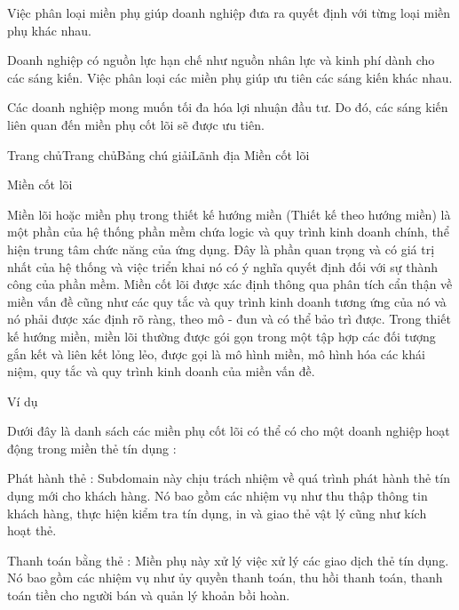 Việc phân loại miền phụ giúp doanh nghiệp đưa ra quyết định với từng loại miền phụ khác nhau.

Doanh nghiệp có nguồn lực hạn chế như nguồn nhân lực và kinh phí dành cho các sáng kiến. Việc phân loại các miền phụ giúp ưu tiên các sáng kiến khác nhau.

Các doanh nghiệp mong muốn tối đa hóa lợi nhuận đầu tư. Do đó, các sáng kiến liên quan đến miền phụ cốt lõi sẽ được ưu tiên.


%






Trang chủTrang chủBảng chú giảiLãnh địa Miền cốt lõi

Miền cốt lõi

Miền lõi hoặc miền phụ trong thiết kế hướng miền (Thiết kế theo hướng miền) là một phần của hệ thống phần mềm chứa logic và quy trình kinh doanh chính, thể hiện trung tâm chức năng của ứng dụng. Đây là phần quan trọng và có giá trị nhất của hệ thống và việc triển khai nó có ý nghĩa quyết định đối với sự thành công của phần mềm. Miền cốt lõi được xác định thông qua phân tích cẩn thận về miền vấn đề cũng như các quy tắc và quy trình kinh doanh tương ứng của nó và nó phải được xác định rõ ràng, theo mô - đun và có thể bảo trì được. Trong thiết kế hướng miền, miền lõi thường được gói gọn trong một tập hợp các đối tượng gắn kết và liên kết lỏng lẻo, được gọi là mô hình miền, mô hình hóa các khái niệm, quy tắc và quy trình kinh doanh của miền vấn đề.

Ví dụ

Dưới đây là danh sách các miền phụ cốt lõi có thể có cho một doanh nghiệp hoạt động trong miền thẻ tín dụng :

Phát hành thẻ : Subdomain này chịu trách nhiệm về quá trình phát hành thẻ tín dụng mới cho khách hàng. Nó bao gồm các nhiệm vụ như thu thập thông tin khách hàng, thực hiện kiểm tra tín dụng, in và giao thẻ vật lý cũng như kích hoạt thẻ.

Thanh toán bằng thẻ : Miền phụ này xử lý việc xử lý các giao dịch thẻ tín dụng. Nó bao gồm các nhiệm vụ như ủy quyền thanh toán, thu hồi thanh toán, thanh toán tiền cho người bán và quản lý khoản bồi hoàn.


